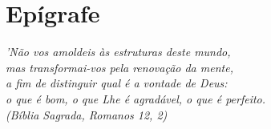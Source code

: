 \documentclass[a4paper]{abnt}
\begin{document}

\cleardoublepage

{\color{white}
 \chapter*{Epígrafe}
}

\begin{flushright}
\vspace{17cm}
\emph{'Não vos amoldeis às estruturas deste mundo, \\
mas transformai-vos pela renovação da mente, \\
a fim de distinguir qual é a vontade de Deus: \\
o que é bom, o que Lhe é agradável, o que é perfeito.\\
(Bíblia Sagrada, Romanos 12, 2)}
\end{flushright}
\end{document}

